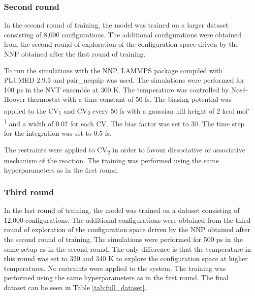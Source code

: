 \subsubsection{Second round}
In the second round of training, the model was trained on a larger dataset consisting of 8,000 configurations. The additional configurations were obtained from the second round of exploration of the configuration space driven by the NNP obtained after the first round of training.

To run the simulations with the NNP, LAMMPS package \citep{thompsonLAMMPSFlexibleSimulation2022} compiled with PLUMED 2.9.3 \citep{tribelloPLUMED2New2014} and pair\_nequip \citep{MirgroupPair_nequip} was used. The simulations were performed for 100 ps in the NVT ensemble at 300 K. The temperature was controlled by Nos\'e-Hoover thermostat \citep{noseUnifiedFormulationConstant1984, hooverCanonicalDynamicsEquilibrium1985} with a time constant of 50 fs. The biasing potential was applied to the CV\textsubscript{1} and CV\textsubscript{2} every 50 fs with a gaussian hill height of 2 kcal mol\textsuperscript{-1} and a width of 0.07 for each CV. The bias factor was set to 30. The time step for the integration was set to 0.5 fs.

The restraints were applied to CV\textsubscript{2} in order to favour dissociative or associative mechanism of the reaction. The training was performed using the same hyperparameters as in the first round.

\subsubsection{Third round}
In the last round of training, the model was trained on a dataset consisting of 12,000 configurations. The additional configurations were obtained from the third round of exploration of the configuration space driven by the NNP obtained after the second round of training. The simulations were performed for 500 ps in the same setup as in the second round. The only difference is that the temperature in this round was set to 320 and 340 K to explore the configuration space at higher temperatures. No restraints were applied to the system. The training was performed using the same hyperparameters as in the first round. The final dataset can be seen in Table \ref{tab:full_dataset}.




